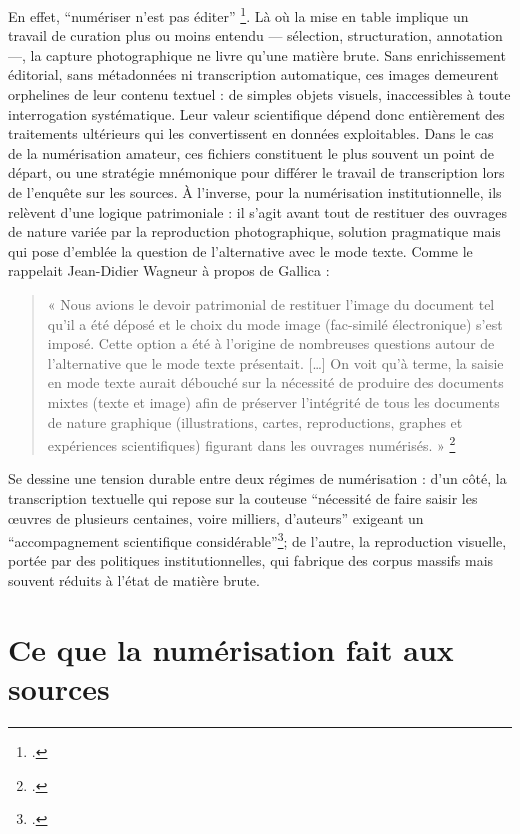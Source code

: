 En effet, \enquote{numériser n’est pas éditer} \footcite[][]{bermesblog}. Là où la mise en table implique un travail de curation plus ou moins entendu — sélection, structuration, annotation —, la capture photographique ne livre qu’une matière brute. Sans enrichissement éditorial, sans métadonnées ni transcription automatique, ces images demeurent orphelines de leur contenu textuel : de simples objets visuels, inaccessibles à toute interrogation systématique. Leur valeur scientifique dépend donc entièrement des traitements ultérieurs qui les convertissent en données exploitables. Dans le cas de la numérisation amateur, ces fichiers constituent le plus souvent un point de départ, ou une stratégie mnémonique pour différer le travail de transcription lors de l’enquête sur les sources. À l’inverse, pour la numérisation institutionnelle, ils relèvent d’une logique patrimoniale : il s’agit avant tout de restituer des ouvrages de nature variée par la reproduction photographique, solution pragmatique mais qui pose d’emblée la question de l’alternative avec le mode texte. Comme le rappelait Jean-Didier Wagneur à propos de Gallica :

\begin{quote}
« Nous avions le devoir patrimonial de restituer l’image du document tel qu’il a été déposé et le choix du mode image (fac-similé électronique) s’est imposé. Cette option a été à l’origine de nombreuses questions autour de l’alternative que le mode texte présentait. […] On voit qu’à terme, la saisie en mode texte aurait débouché sur la nécessité de produire des documents mixtes (texte et image) afin de préserver l’intégrité de tous les documents de nature graphique (illustrations, cartes, reproductions, graphes et expériences scientifiques) figurant dans les ouvrages numérisés. » \footcite[][]{wagneur}

\end{quote}
Se dessine une tension durable entre deux régimes de numérisation : d’un côté, la transcription textuelle qui repose sur la couteuse \enquote{nécessité de faire saisir les œuvres de plusieurs centaines, voire milliers, d’auteurs} exigeant un \enquote{accompagnement scientifique considérable}\footcite[][]{wagneur}; de l’autre, la reproduction visuelle, portée par des politiques institutionnelles, qui fabrique des corpus massifs mais souvent réduits à l’état de matière brute.

\section{Ce que la numérisation fait aux sources}

